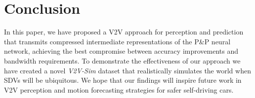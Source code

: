 \documentclass[runningheads]{llncs}
\newcommand{\pnp}{P\&P}
\begin{document}
\section{Conclusion}

In this paper, we have proposed a V2V 
approach for perception and prediction that transmits compressed intermediate representations 
of the \pnp{} neural network,
achieving the best compromise between accuracy improvements and bandwidth requirements. 
To demonstrate the effectiveness of our approach we have created a novel {\it V2V-Sim} 
dataset that realistically simulates the world when SDVs will be ubiquitous.
We hope that our findings will inspire future work in V2V perception and motion forecasting strategies for safer self-driving cars.






\end{document}
